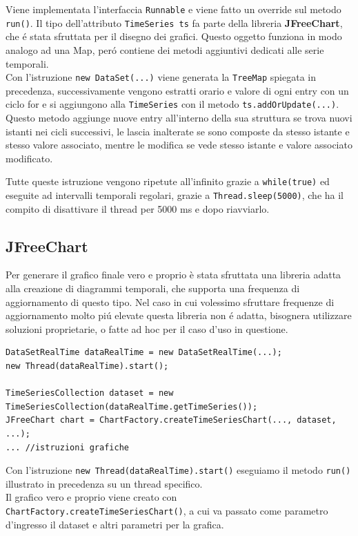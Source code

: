 Viene implementata l'interfaccia \texttt{Runnable} e viene fatto un override sul metodo \texttt{run()}.
Il tipo dell'attributo \texttt{TimeSeries ts} fa parte della libreria \textbf{JFreeChart}, che é stata sfruttata per il disegno dei grafici.
Questo oggetto funziona in modo analogo ad una Map, peró contiene dei metodi aggiuntivi dedicati alle serie temporali.\\
Con l'istruzione \texttt{new DataSet(...)} viene generata la \texttt{TreeMap} spiegata in precedenza, successivamente
vengono estratti orario e valore di ogni entry con un ciclo for e si aggiungono alla \texttt{TimeSeries} con
il metodo \texttt{ts.addOrUpdate(...)}.
Questo metodo aggiunge nuove entry all'interno della sua struttura se trova nuovi istanti nei cicli successivi,
le lascia inalterate se sono composte da stesso istante e stesso valore associato, mentre le modifica se vede stesso istante e valore associato
modificato.

Tutte queste istruzione vengono ripetute all'infinito grazie a \texttt{while(true)} ed eseguite ad intervalli temporali regolari,
grazie a \texttt{Thread.sleep(5000)}, che ha il compito di disattivare il thread per 5000 ms e dopo riavviarlo.


\subsection{JFreeChart}
Per generare il grafico finale vero e proprio è stata sfruttata una libreria adatta alla creazione di diagrammi temporali, che supporta una frequenza di
aggiornamento di questo tipo.
Nel caso in cui volessimo sfruttare frequenze di aggiornamento molto piú elevate questa libreria non é adatta,
bisognera utilizzare soluzioni proprietarie, o fatte ad hoc per il caso d'uso in questione.

\begin{lstlisting}[autogobble, title={\texttt{DataSetRealTime.java}}]
DataSetRealTime dataRealTime = new DataSetRealTime(...);
new Thread(dataRealTime).start();

TimeSeriesCollection dataset = new TimeSeriesCollection(dataRealTime.getTimeSeries());
JFreeChart chart = ChartFactory.createTimeSeriesChart(..., dataset, ...);
... //istruzioni grafiche
\end{lstlisting}

Con l'istruzione \texttt{new Thread(dataRealTime).start()} eseguiamo il metodo \texttt{run()}
illustrato in precedenza su un thread specifico.\\
Il grafico vero e proprio viene creato con \texttt{ChartFactory.createTimeSeriesChart()}, a cui
va passato come parametro d'ingresso il dataset e altri parametri per la grafica.


